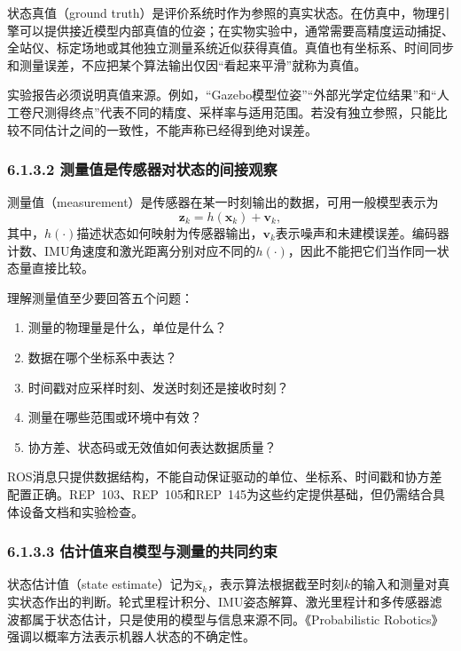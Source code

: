 \documentclass[UTF8,zihao=-4]{ctexart}
\newcommand{\vect}[1]{\bm{#1}}
\begin{document}
状态真值（ground truth）是评价系统时作为参照的真实状态。在仿真中，物理引擎可以提供接近模型内部真值的位姿；在实物实验中，通常需要高精度运动捕捉、全站仪、标定场地或其他独立测量系统近似获得真值。真值也有坐标系、时间同步和测量误差，不应把某个算法输出仅因“看起来平滑”就称为真值。

实验报告必须说明真值来源。例如，“Gazebo模型位姿”“外部光学定位结果”和“人工卷尺测得终点”代表不同的精度、采样率与适用范围。若没有独立参照，只能比较不同估计之间的一致性，不能声称已经得到绝对误差。

\subsubsection*{6.1.3.2 测量值是传感器对状态的间接观察}

测量值（measurement）是传感器在某一时刻输出的数据，可用一般模型表示为
\begin{equation}
  \vect{z}_k=h(\vect{x}_k)+\vect{v}_k,
  \label{eq:measurement-model}
\end{equation}
其中，$h(\cdot)$描述状态如何映射为传感器输出，$\vect{v}_k$表示噪声和未建模误差。编码器计数、IMU角速度和激光距离分别对应不同的$h(\cdot)$，因此不能把它们当作同一状态量直接比较。

理解测量值至少要回答五个问题：
\begin{enumerate}
  \item 测量的物理量是什么，单位是什么？
  \item 数据在哪个坐标系中表达？
  \item 时间戳对应采样时刻、发送时刻还是接收时刻？
  \item 测量在哪些范围或环境中有效？
  \item 协方差、状态码或无效值如何表达数据质量？
\end{enumerate}

ROS消息只提供数据结构，不能自动保证驱动的单位、坐标系、时间戳和协方差配置正确。REP~103、REP~105和REP~145为这些约定提供基础，但仍需结合具体设备文档和实验检查\cite{rep103,rep105,rep145}。

\subsubsection*{6.1.3.3 估计值来自模型与测量的共同约束}

状态估计值（state estimate）记为$\hat{\vect{x}}_k$，表示算法根据截至时刻$k$的输入和测量对真实状态作出的判断。轮式里程计积分、IMU姿态解算、激光里程计和多传感器滤波都属于状态估计，只是使用的模型与信息来源不同。《Probabilistic Robotics》强调以概率方法表示机器人状态的不确定性\cite{thrun2005}。
\end{document}
